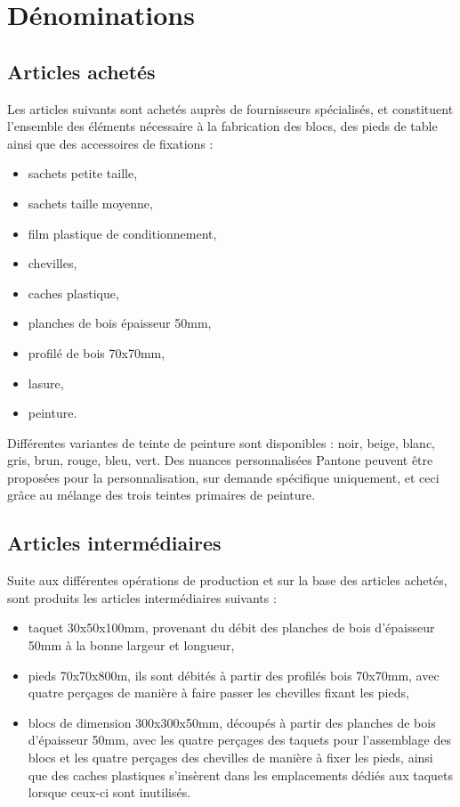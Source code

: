 \section{Dénominations}

\subsection{Articles achetés}

Les articles suivants sont achetés auprès de fournisseurs spécialisés,
et constituent l'ensemble des éléments nécessaire à la fabrication des blocs,
des pieds de table ainsi que des accessoires de fixations :

\begin{itemize}
	\item sachets petite taille,
	\item sachets taille moyenne,
	\item film plastique de conditionnement,
	\item chevilles,
	\item caches plastique,
	\item planches de bois épaisseur 50mm,
	\item profilé de bois 70x70mm,
	\item lasure,
	\item peinture.
\end{itemize}

Différentes variantes de teinte de peinture sont disponibles :
noir, beige, blanc, gris, brun, rouge, bleu, vert.
Des nuances personnalisées Pantone\textregistered{} peuvent être proposées
pour la personnalisation, sur demande spécifique uniquement, et ceci grâce
au mélange des trois teintes primaires de peinture.

\subsection{Articles intermédiaires}

Suite aux différentes opérations de production et sur la base des articles
achetés, sont produits les articles intermédiaires suivants :

\begin{itemize}
	\item taquet 30x50x100mm, provenant du débit des planches de bois
	d'épaisseur 50mm à la bonne largeur et longueur,
	\item pieds 70x70x800m, ils sont débités à partir des profilés bois
	70x70mm, avec quatre perçages de manière à faire passer les chevilles
	fixant les pieds,
	\item blocs de dimension 300x300x50mm, découpés à partir des planches de
	bois d'épaisseur 50mm, avec les quatre perçages des taquets pour l'assemblage
	des blocs et les quatre perçages des chevilles de manière à fixer les pieds,
	ainsi que des caches plastiques s'insèrent dans les emplacements dédiés
	aux taquets lorsque ceux-ci sont inutilisés.
\end{itemize}

